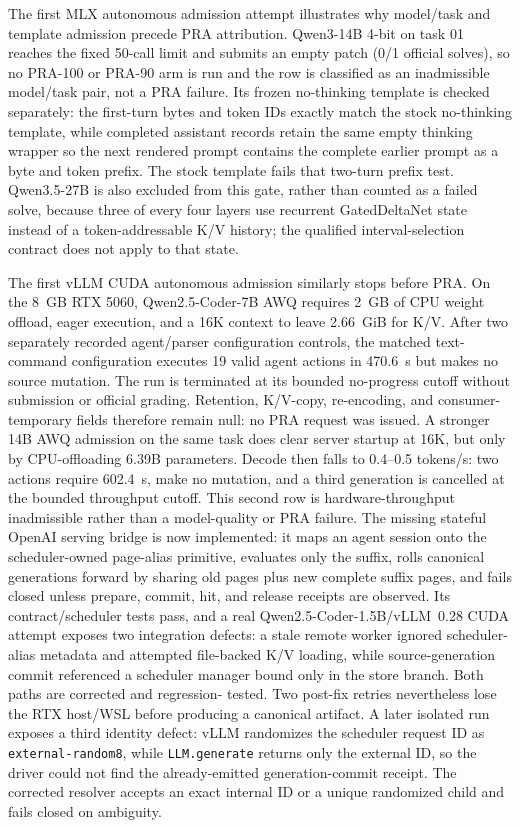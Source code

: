 \documentclass[11pt]{article}
\begin{document}
The first MLX autonomous admission attempt illustrates why model/task and
template admission precede PRA attribution.  Qwen3-14B 4-bit on task 01 reaches
the fixed 50-call limit and submits an empty patch (0/1 official solves), so no
PRA-100 or PRA-90 arm is run and the row is classified as an inadmissible
model/task pair, not a PRA failure.  Its frozen no-thinking template is checked
separately: the first-turn bytes and token IDs exactly match the stock
no-thinking template, while completed assistant records retain the same empty
thinking wrapper so the next rendered prompt contains the complete earlier
prompt as a byte and token prefix.  The stock template fails that two-turn
prefix test.  Qwen3.5-27B is also excluded from this gate, rather than counted
as a failed solve, because three of every four layers use recurrent
GatedDeltaNet state instead of a token-addressable K/V history; the qualified
interval-selection contract does not apply to that state.

The first vLLM CUDA autonomous admission similarly stops before PRA.  On the
8~GB RTX 5060, Qwen2.5-Coder-7B AWQ requires 2~GB of CPU weight offload,
eager execution, and a 16K context to leave 2.66~GiB for K/V.  After two
separately recorded agent/parser configuration controls, the matched
text-command configuration executes 19 valid agent actions in 470.6~s but
makes no source mutation.  The run is terminated at its bounded no-progress
cutoff without submission or official grading.  Retention, K/V-copy,
re-encoding, and consumer-temporary fields therefore remain null: no PRA
request was issued.  A stronger 14B AWQ admission on the same task does clear
server startup at 16K, but only by CPU-offloading 6.39B parameters.  Decode then
falls to 0.4--0.5 tokens/s: two actions require 602.4~s, make no mutation, and a
third generation is cancelled at the bounded throughput cutoff.  This second
row is hardware-throughput inadmissible rather than a model-quality or PRA
failure.  The missing stateful OpenAI serving bridge is now implemented: it
maps an agent session onto the scheduler-owned page-alias primitive, evaluates
only the suffix, rolls canonical generations forward by sharing old pages plus
new complete suffix pages, and fails closed unless prepare, commit, hit, and
release receipts are observed.  Its contract/scheduler tests pass, and a real
Qwen2.5-Coder-1.5B/vLLM~0.28 CUDA attempt exposes two integration defects: a
stale remote worker ignored scheduler-alias metadata and attempted file-backed
K/V loading, while source-generation commit referenced a scheduler manager
bound only in the store branch.  Both paths are corrected and regression-
tested.  Two post-fix retries nevertheless lose the RTX host/WSL before
producing a canonical artifact.  A later isolated run exposes a third identity
defect: vLLM randomizes the scheduler request ID as
\texttt{external-random8}, while \texttt{LLM.generate} returns only the
external ID, so the driver could not find the already-emitted generation-commit
receipt.  The corrected resolver accepts an exact internal ID or a unique
randomized child and fails closed on ambiguity.
\end{document}
